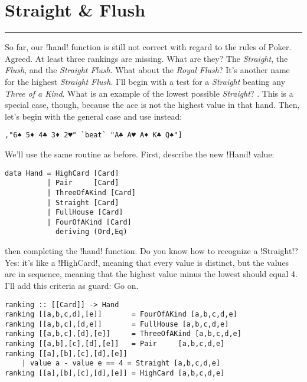 \newpage
\section{Straight \& Flush} 
\vspace{10cm}
\hrule

\lhQ So far, our \il!hand! function is still not correct with regard to the rules of Poker.
\lhA Agreed. At least three rankings are missing.
\lhN What are they?
\lhA The \emph{Straight}, the \emph{Flush}, and the \emph{Straight Flush}.
\lhN What about the \emph{Royal Flush}?
\lhA It's another name for the highest \emph{Straight Flush}.
\lhN I'll begin with a test for a \emph{Straight} beating any \emph{Three of a Kind}. What is an example of the lowest possible \emph{Straight}?
\lhA {}    . This is a special case, though, because the ace is not the highest value in that hand.
\lhN Then, let's begin with the general case and use      instead:
\begin{lstlisting}[frame=single]
        ,"6♠ 5♦ 4♣ 3♦ 2♥" `beat` "A♣ A♥ A♦ K♣ Q♠"]
\end{lstlisting}
\hspace*{\fill}
\lhA \failure We'll use the same routine as before. First, describe the new \il!Hand! value:
\begin{lstlisting}[frame=single]
data Hand = HighCard [Card]
          | Pair     [Card]
          | ThreeOfAKind [Card]
          | Straight [Card]
          | FullHouse [Card]
          | FourOfAKind [Card]
            deriving (Ord,Eq)
\end{lstlisting}
\failure then completing the \il!hand! function.
\lhN Do you know how to recognize a \il!Straight!?
\lhA \failure Yes: it's like a \il!HighCard!, meaning that every value is distinct, but the values are in sequence, meaning that the highest value minus the lowest should equal 4. I'll add this criteria as guard:
\lhN Go on.
\lhA
\begin{lstlisting}[frame=single]
ranking :: [[Card]] -> Hand
ranking [[a,b,c,d],[e]]       = FourOfAKind [a,b,c,d,e]
ranking [[a,b,c],[d,e]]       = FullHouse [a,b,c,d,e]
ranking [[a,b,c],[d],[e]]     = ThreeOfAKind [a,b,c,d,e]
ranking [[a,b],[c],[d],[e]]   = Pair     [a,b,c,d,e]
ranking [[a],[b],[c],[d],[e]] 
    | value a - value e == 4 = Straight [a,b,c,d,e] 
ranking [[a],[b],[c],[d],[e]] = HighCard [a,b,c,d,e] 
\end{lstlisting}
